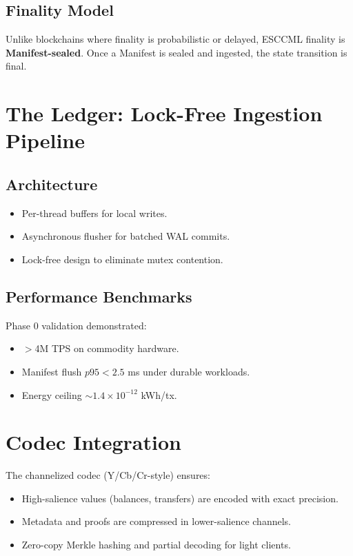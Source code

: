 \documentclass[11pt, a4paper]{article}
\begin{document}
\subsection{Finality Model}
Unlike blockchains where finality is probabilistic or delayed, ESCCML finality is
\textbf{Manifest-sealed}. Once a Manifest is sealed and ingested, the state transition is final.

\section{The Ledger: Lock-Free Ingestion Pipeline}
\subsection{Architecture}
\begin{itemize}
    \item Per-thread buffers for local writes.
    \item Asynchronous flusher for batched WAL commits.
    \item Lock-free design to eliminate mutex contention.
\end{itemize}

\subsection{Performance Benchmarks}
Phase 0 validation demonstrated:
\begin{itemize}
    \item $>$4M TPS on commodity hardware.
    \item Manifest flush $p95 < 2.5$ ms under durable workloads.
    \item Energy ceiling $\sim 1.4 \times 10^{-12}$ kWh/tx.
\end{itemize}

\section{Codec Integration}
The channelized codec (Y/Cb/Cr-style) ensures:
\begin{itemize}
    \item High-salience values (balances, transfers) are encoded with exact precision.
    \item Metadata and proofs are compressed in lower-salience channels.
    \item Zero-copy Merkle hashing and partial decoding for light clients.
\end{itemize}
\end{document}
